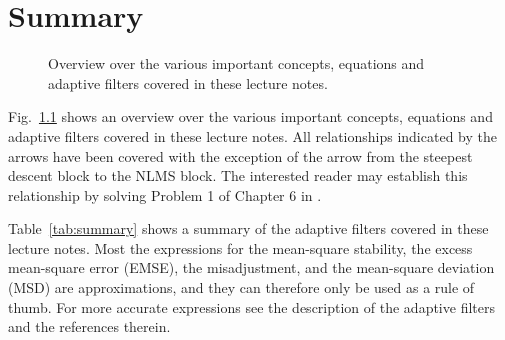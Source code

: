 \chapter{Summary}
\label{ch:summary}
\begin{figure}
  \centering
  \caption{Overview over the various important concepts, equations and adaptive filters covered in these lecture notes.}
  \label{fig:overview}
\end{figure}
\noindent Fig.~\ref{fig:overview} shows an overview over the various important concepts, equations and adaptive filters covered in these lecture notes. All relationships indicated by the arrows have been covered with the exception of the arrow from the steepest descent block to the NLMS block. The interested reader may establish this relationship by solving Problem 1 of Chapter 6 in \cite{Haykin2001}.

Table~\ref{tab:summary} shows a summary of the adaptive filters covered in these lecture notes. Most the expressions for the mean-square stability, the excess mean-square error (EMSE), the misadjustment, and the mean-square deviation (MSD) are approximations, and they can therefore only be used as a rule of thumb. For more accurate expressions see the description of the adaptive filters and the references therein.

